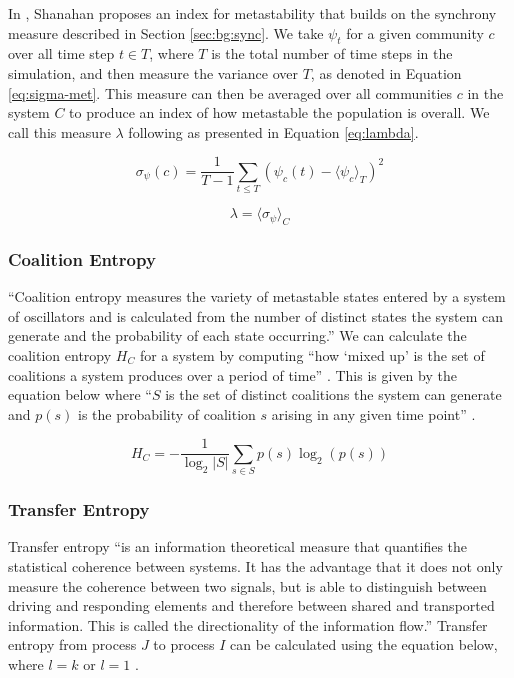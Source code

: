 \documentclass[a4paper,11pt]{article}
\begin{document}
In \cite{Shanahan2010}, Shanahan proposes an index for metastability that builds on the synchrony measure described in Section \ref{sec:bg:sync}. We take $\psi_t$ for a given community $c$ over all time step $t \in T$, where $T$ is the total number of time steps in the simulation, and then measure the variance over $T$, as denoted in Equation \ref{eq:sigma-met}. This measure can then be averaged over all communities $c$ in the system $C$ to produce an index of how metastable the population is overall. We call this measure $\lambda$ following \cite{Shanahan2010} as presented in Equation \ref{eq:lambda}.

\begin{equation} \label{eq:sigma-met}
\sigma_{\psi}(c) = \frac{1}{T - 1} \sum_{t \leq T }(\psi_{c}(t) - \langle \psi_{c}\rangle_T)^2
\end{equation}

\begin{equation} \label{eq:lambda}
\lambda = \langle \sigma_{\psi} \rangle_C
\end{equation}

\subsubsection{Coalition Entropy} \label{sec:bg:hc}

``Coalition entropy measures the variety of metastable states entered by a system of oscillators and is calculated from the number of distinct states the system can generate and the probability of each state occurring.'' \cite{Bhowmik2013} We can calculate the coalition entropy $H_C$ for a system by computing ``how `mixed up' is the set of coalitions a system produces over a period of time'' \cite{Shanahan2010}. This is given by the equation below where ``$S$ is the set of distinct coalitions the system can generate and $p(s)$ is the probability of coalition $s$ arising in any given time point'' \cite{Shanahan2010}.

\begin{equation} \label{eq:hc}
H_C = - \frac{1}{\log_2 |S|}\sum_{s \in S}p(s) \log_2 (p(s))
\end{equation}

\subsubsection{Transfer Entropy}
Transfer entropy ``is an information theoretical measure that quantifies the statistical coherence between systems. It has the advantage that it does not only measure the coherence between two signals, but is able to distinguish between driving and responding elements and therefore between shared and transported information. This is called the directionality of the information flow.'' \cite{Buehlmann2010} Transfer entropy from process $J$ to process $I$ can be calculated using the equation below, where $l = k$ or $l = 1$ \cite{Schreiber2000}.
\end{document}
